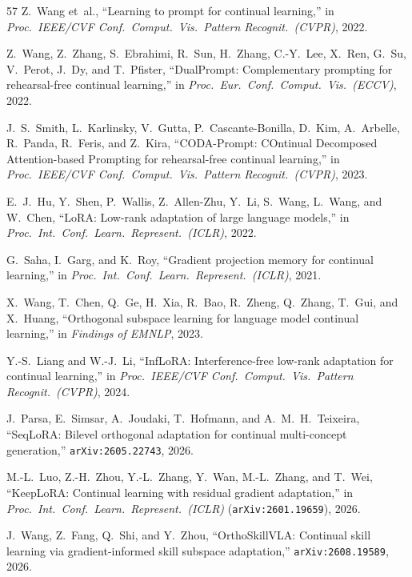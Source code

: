 \documentclass[10pt]{article}
\begin{document}
\begin{thebibliography}{57}
Z.~Wang et~al., ``Learning to prompt for continual learning,'' in \emph{Proc.\ IEEE/CVF Conf.\ Comput.\ Vis.\ Pattern Recognit.\ (CVPR)}, 2022.

Z.~Wang, Z.~Zhang, S.~Ebrahimi, R.~Sun, H.~Zhang, C.-Y.~Lee, X.~Ren, G.~Su, V.~Perot, J.~Dy, and T.~Pfister, ``DualPrompt: Complementary prompting for rehearsal-free continual learning,'' in \emph{Proc.\ Eur.\ Conf.\ Comput.\ Vis.\ (ECCV)}, 2022.

J.~S.~Smith, L.~Karlinsky, V.~Gutta, P.~Cascante-Bonilla, D.~Kim, A.~Arbelle, R.~Panda, R.~Feris, and Z.~Kira, ``CODA-Prompt: COntinual Decomposed Attention-based Prompting for rehearsal-free continual learning,'' in \emph{Proc.\ IEEE/CVF Conf.\ Comput.\ Vis.\ Pattern Recognit.\ (CVPR)}, 2023.

E.~J.~Hu, Y.~Shen, P.~Wallis, Z.~Allen-Zhu, Y.~Li, S.~Wang, L.~Wang, and W.~Chen, ``LoRA: Low-rank adaptation of large language models,'' in \emph{Proc.\ Int.\ Conf.\ Learn.\ Represent.\ (ICLR)}, 2022.

G.~Saha, I.~Garg, and K.~Roy, ``Gradient projection memory for continual learning,'' in \emph{Proc.\ Int.\ Conf.\ Learn.\ Represent.\ (ICLR)}, 2021.

X.~Wang, T.~Chen, Q.~Ge, H.~Xia, R.~Bao, R.~Zheng, Q.~Zhang, T.~Gui, and X.~Huang, ``Orthogonal subspace learning for language model continual learning,'' in \emph{Findings of EMNLP}, 2023.

Y.-S.~Liang and W.-J.~Li, ``InfLoRA: Interference-free low-rank adaptation for continual learning,'' in \emph{Proc.\ IEEE/CVF Conf.\ Comput.\ Vis.\ Pattern Recognit.\ (CVPR)}, 2024.

J.~Parsa, E.~Simsar, A.~Joudaki, T.~Hofmann, and A.~M.~H.~Teixeira, ``SeqLoRA: Bilevel orthogonal adaptation for continual multi-concept generation,'' \texttt{arXiv:2605.22743}, 2026.

M.-L.~Luo, Z.-H.~Zhou, Y.-L.~Zhang, Y.~Wan, M.-L.~Zhang, and T.~Wei, ``KeepLoRA: Continual learning with residual gradient adaptation,'' in \emph{Proc.\ Int.\ Conf.\ Learn.\ Represent.\ (ICLR)} (\texttt{arXiv:2601.19659}), 2026.

J.~Wang, Z.~Fang, Q.~Shi, and Y.~Zhou, ``OrthoSkillVLA: Continual skill learning via gradient-informed skill subspace adaptation,'' \texttt{arXiv:2608.19589}, 2026.


\end{thebibliography}
\end{document}
